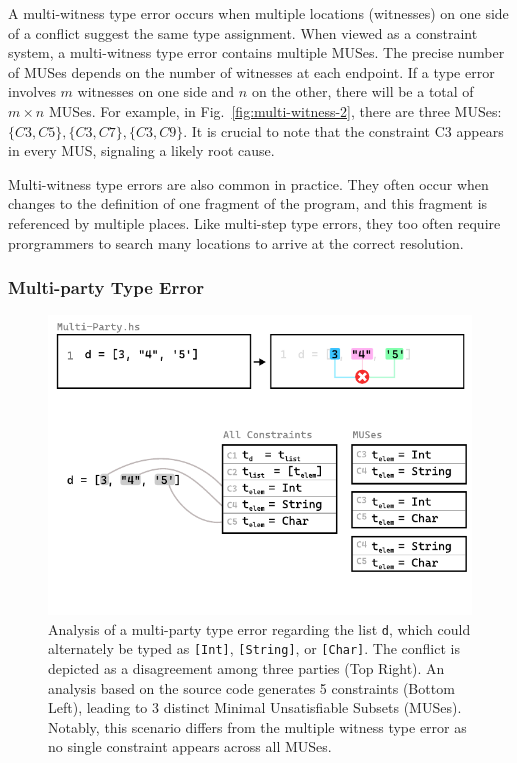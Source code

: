 \documentclass[pdflatex,sn-nature,Numbered]{sn-jnl}%
\begin{document}
A multi-witness type error occurs when multiple locations (witnesses) on one side of a conflict suggest the same type assignment. When viewed as a constraint system, a multi-witness type error contains multiple MUSes. The precise number of MUSes depends on the number of witnesses at each endpoint. If a type error involves $m$ witnesses on one side and $n$ on the other, there will be a total of $m \times n$ MUSes. For example, in Fig.~\ref{fig:multi-witness-2}, there are three MUSes: $\{C3, C5\}, \{C3, C7\}, \{C3, C9\}$. It is crucial to note that the constraint C3 appears in every MUS, signaling a likely root cause.

Multi-witness type errors are also common in practice. They often occur when changes to the definition of one fragment of the program, and this fragment is referenced by multiple places. Like multi-step type errors, they too often require prorgrammers to search many locations to arrive at the correct resolution.

\subsubsection*{Multi-party Type Error}

\begin{figure}[hbt]
  \centering
  \includegraphics[width=\linewidth]{images/Multi-Party-MUS}
  \caption{\label{fig:multi-party-2} Analysis of a multi-party type error regarding the list \texttt{d}, which could alternately be typed as \texttt{[Int]}, \texttt{[String]}, or \texttt{[Char]}. The conflict is depicted as a disagreement among three parties (Top Right). An analysis based on the source code generates 5 constraints (Bottom Left), leading to 3 distinct Minimal Unsatisfiable Subsets (MUSes). Notably, this scenario differs from the multiple witness type error as no single constraint appears across all MUSes.}
  \end{figure}
\end{document}
